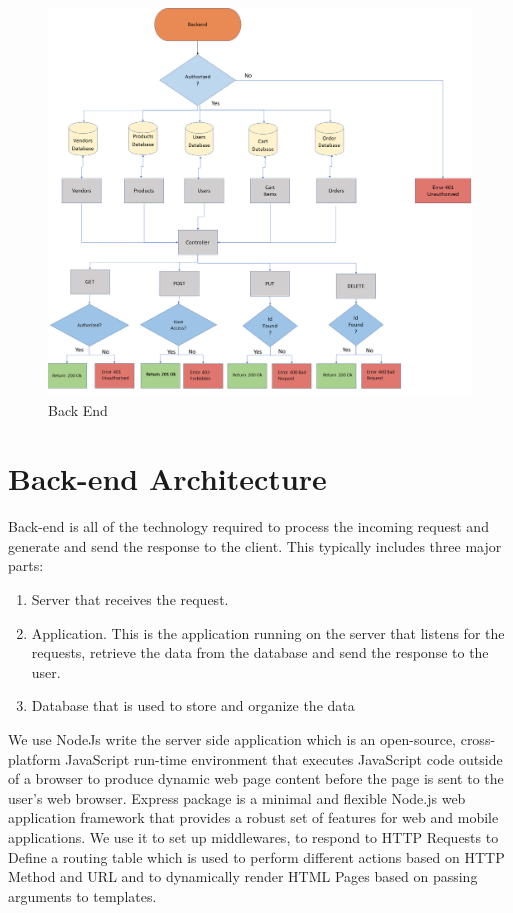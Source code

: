  
\begin{figure}[htp]%
    \center%
    \includegraphics[width=1\textwidth]{images/Software/backend1.png}%
    \caption[Back End]{Back End}\label{fig: Back End}%
  \end{figure}




\section{Back-end Architecture}
\hspace{2cm}Back-end is all of the technology required to process the incoming request and generate and send the response to the client. This typically includes three major parts:
    \begin{enumerate}
    \setcounter{enumi}{0}
    \item Server that receives the request.
    \item Application. This is the application running on the server that listens for the requests, retrieve the data from the database and send the response to the user.
    \item Database that is used to store and organize the data
    \end{enumerate}
    
We use NodeJs write the server side application which is an open-source, cross-platform JavaScript run-time environment that executes JavaScript code outside of a browser to produce dynamic web page content before the page is sent to the user's web browser.
Express package is a minimal and flexible Node.js web application framework that provides a robust set of features for web and mobile applications. We use it  to  set up middlewares, to respond to HTTP Requests to Define a routing table which is used to perform different actions based on HTTP Method and URL 
and to dynamically render HTML Pages based on passing arguments to templates.

